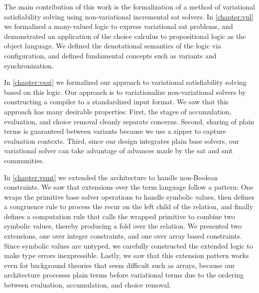 \label{section:conclusion:cont-summary}

The main contribution of this work is the formalization of a method of
variational satisfiability solving using non-variational incremental \ac{sat}
solvers.
%
In \autoref{chapter:vpl} we formalized a many-valued logic to express
variational \ac{sat} problems, and demonstrated an application of the choice
calculus to propositional logic as the object language. We defined the
denotational semantics of the logic via configuration, and defined fundamental
concepts such as variants and synchronization.

In \autoref{chapter:vsat} we formalized our approach to variational
satisfiability solving based on this logic. Our approach is to variationalize
non-variational solvers by constructing a compiler to a standardized input
format. We saw that this approach has many desirable properties: First, the
stages of accumulation, evaluation, and choice removal cleanly separate
concerns. Second, sharing of plain terms is guaranteed between variants because
we use a zipper to capture evaluation contexts. Third, since our design
integrates plain base solvers, our variational solver can take advantage of
advances made by the \ac{sat} and \ac{smt} communities.
%

In \autoref{chapter:vsmt} we extended the architecture to handle non-Boolean
constraints. We saw that extensions over the term language follow a pattern: One
wraps the primitive base solver operations to handle symbolic values, then
defines a congruence rule to process the recur on the left child of the
relation, and finally defines a computation rule that calls the wrapped
primitive to combine two symbolic values, thereby producing a fold over the
relation. We presented two extensions, one over integer constraints, and one
over array based constraints. Since symbolic values are untyped, we carefully
constructed the extended logic to make type errors inexpressible. Lastly, we saw
that this extension pattern works even for background theories that seem
difficult such as arrays, because our architecture processes plain terms before
variational terms due to the ordering between evaluation, accumulation, and
choice removal.

